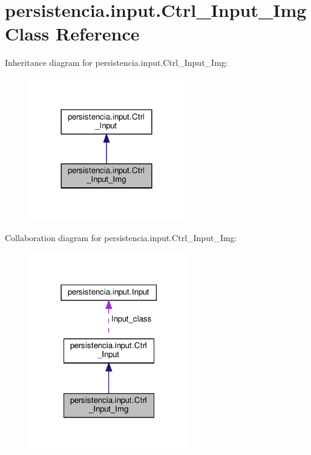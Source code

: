 \hypertarget{classpersistencia_1_1input_1_1Ctrl__Input__Img}{}\section{persistencia.\+input.\+Ctrl\+\_\+\+Input\+\_\+\+Img Class Reference}
\label{classpersistencia_1_1input_1_1Ctrl__Input__Img}


Inheritance diagram for persistencia.\+input.\+Ctrl\+\_\+\+Input\+\_\+\+Img\+:\nopagebreak
\begin{figure}[H]
\begin{center}
\leavevmode
\includegraphics[width=192pt]{classpersistencia_1_1input_1_1Ctrl__Input__Img__inherit__graph}
\end{center}
\end{figure}


Collaboration diagram for persistencia.\+input.\+Ctrl\+\_\+\+Input\+\_\+\+Img\+:\nopagebreak
\begin{figure}[H]
\begin{center}
\leavevmode
\includegraphics[width=198pt]{classpersistencia_1_1input_1_1Ctrl__Input__Img__coll__graph}
\end{center}
\end{figure}
